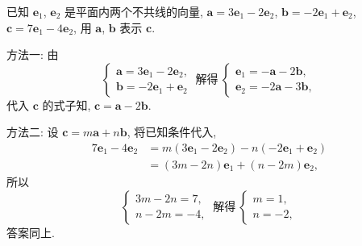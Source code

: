 \begin{exercise}
    已知 $\bm{e}_1$, $\bm{e}_2$ 是平面内两个不共线的向量, $\bm{a}=3\bm{e}_1 -2\bm{e}_2$,
    $\bm{b}=-2\bm{e}_1 +\bm{e}_2$, $\bm{c} =7\bm{e}_1 -4\bm{e}_2$, 
    用 $\bm{a}$, $\bm{b}$ 表示 $\bm{c}$.
\end{exercise}
\beginsolution
    方法一: 由
    \[\left\{\!\!\begin{array}{l}
        \bm{a}=3\bm{e}_1 -2\bm{e}_2,\\
        \bm{b}=-2\bm{e}_1 +\bm{e}_2
    \end{array}\right.\ \text{解得}\ 
    \left\{\!\!\begin{array}{l}
        \bm{e}_1= -\bm{a}- 2\bm{b},\\
        \bm{e}_2= -2\bm{a}- 3\bm{b},
    \end{array}\right.\]
    代入 $\bm{c}$ 的式子知, $\bm{c}= \bm{a}-2\bm{b}$.

    方法二: 设 $\bm{c}= m\bm{a}+ n\bm{b}$, 将已知条件代入,
    \[\begin{aligned}
        7\bm{e}_1 -4\bm{e}_2
        &= m(3\bm{e}_1 -2\bm{e}_2)- n(-2\bm{e}_1 +\bm{e}_2)\\
        &= (3m-2n)\bm{e}_1+ (n-2m)\bm{e}_2,
    \end{aligned}\]
    所以
    \[\left\{\!\!\begin{array}{l}
        3m-2n= 7,\\
        n-2m= -4,
    \end{array}\right.\ \text{解得}\ 
    \left\{\!\!\begin{array}{l}
        m=1,\\
        n=-2,
    \end{array}\right.\]
    答案同上.
\endsolution